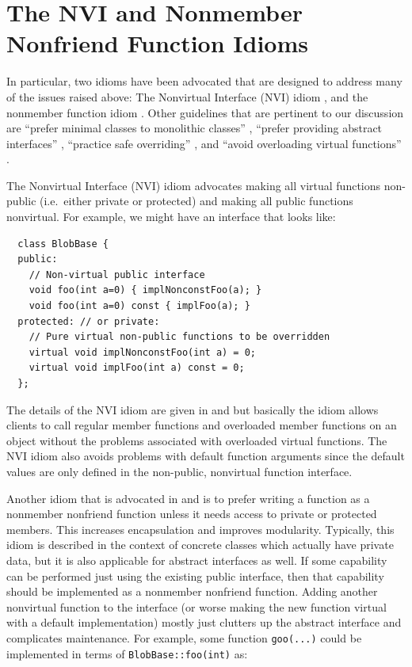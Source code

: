 \documentclass[pdf,ps2pdf,11pt]{SANDreport}
\begin{document}
\begin{itemize}
\end{itemize}

%
\section{The NVI and Nonmember Nonfriend Function Idioms}
%

In particular, two idioms have been advocated that are designed to address
many of the issues raised above: The Nonvirtual Interface (NVI) idiom
{}\cite[Item 39]{C++CodingStandards05}, and the nonmember function idiom
{}\cite[Item 44]{C++CodingStandards05}.  Other guidelines that are pertinent
to our discussion are ``prefer minimal classes to monolithic classes''
{}\cite[Item 33]{C++CodingStandards05}, ``prefer providing abstract
interfaces'' {}\cite[Item 36]{C++CodingStandards05}, ``practice safe
overriding'' {}\cite[Item 38]{C++CodingStandards05} {}\cite[Gotcha
74]{C++Gotchas03}, and ``avoid overloading virtual functions'' {}\cite[Gotcha
73]{C++Gotchas03}.

The Nonvirtual Interface (NVI) idiom {}\cite[Item 35]{EffectiveC++3rd}
advocates making all virtual functions non-public (i.e.\ either private or
protected) and making all public functions nonvirtual.  For example, we might
have an interface that looks like:

{\small\begin{verbatim}
  class BlobBase {
  public:
    // Non-virtual public interface
    void foo(int a=0) { implNonconstFoo(a); }
    void foo(int a=0) const { implFoo(a); }
  protected: // or private:
    // Pure virtual non-public functions to be overridden
    virtual void implNonconstFoo(int a) = 0;
    virtual void implFoo(int a) const = 0;
  };
\end{verbatim}}

The details of the NVI idiom are given in {}\cite[Item
39]{C++CodingStandards05} and {}\cite[Item 35]{EffectiveC++3rd} but basically
the idiom allows clients to call regular member functions and overloaded
member functions on an object without the problems associated with overloaded
virtual functions.  The NVI idiom also avoids problems with default function
arguments since the default values are only defined in the non-public,
nonvirtual function interface.

Another idiom that is advocated in {}\cite[Item 44]{C++CodingStandards05} and
{}\cite[Item 23]{EffectiveC++3rd} is to prefer writing a function as a
nonmember nonfriend function unless it needs access to private or protected
members.  This increases encapsulation and improves modularity.  Typically,
this idiom is described in the context of concrete classes which actually have
private data, but it is also applicable for abstract interfaces as well.  If
some capability can be performed just using the existing public interface,
then that capability should be implemented as a nonmember nonfriend function.
Adding another nonvirtual function to the interface (or worse making the new
function virtual with a default implementation) mostly just clutters up the
abstract interface and complicates maintenance.  For example, some function
{}\texttt{goo(...)} could be implemented in terms of
{}\texttt{BlobBase\-::foo(int)} as:
\end{document}
